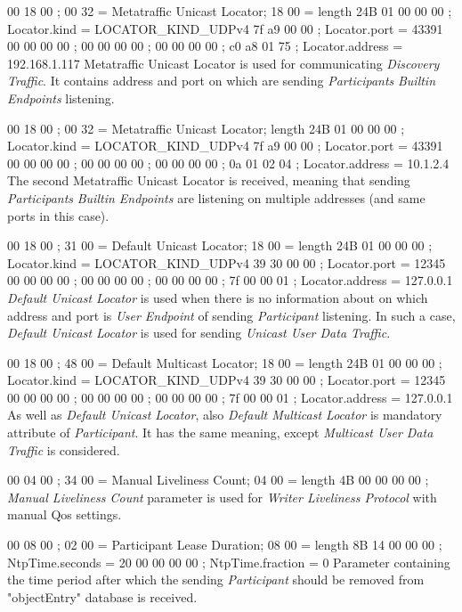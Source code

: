  00 18 00  ; 00 32 = Metatraffic Unicast Locator; 18 00 = length 24B
 01 00 00 00  ; Locator.kind = LOCATOR_KIND_UDPv4
 7f a9 00 00  ; Locator.port = 43391
 00 00 00 00  ;
 00 00 00 00  ;
 00 00 00 00  ;
 c0 a8 01 75  ; Locator.address = 192.168.1.117
\endtt
Metatraffic Unicast Locator is used for communicating {\em Discovery Traffic}. It contains  address and port on which are sending {\em Participants} {\em Builtin Endpoints} listening.

 00 18 00  ; 00 32 = Metatraffic Unicast Locator; length 24B
 01 00 00 00  ; Locator.kind = LOCATOR_KIND_UDPv4
 7f a9 00 00  ; Locator.port = 43391
 00 00 00 00  ;
 00 00 00 00  ;
 00 00 00 00  ;
 0a 01 02 04  ; Locator.address = 10.1.2.4
\endtt
The second Metatraffic Unicast Locator is received, meaning that sending {\em Participants} {\em Builtin Endpoints} are listening on multiple  addresses (and same ports in this case).

 00 18 00  ; 31 00 = Default Unicast Locator; 18 00 = length 24B
 01 00 00 00  ; Locator.kind = LOCATOR_KIND_UDPv4
 39 30 00 00  ; Locator.port = 12345
 00 00 00 00  ;
 00 00 00 00  ;
 00 00 00 00  ;
 7f 00 00 01  ; Locator.address = 127.0.0.1
\endtt
{\em Default Unicast Locator} is used when there is no information about on which  address and port is {\em User Endpoint} of sending {\em Participant} listening. In such a case, {\em Default Unicast Locator} is used for sending {\em Unicast User Data Traffic}.

 00 18 00  ; 48 00 = Default Multicast Locator; 18 00 = length 24B
 01 00 00 00  ; Locator.kind = LOCATOR_KIND_UDPv4
 39 30 00 00  ; Locator.port = 12345
 00 00 00 00  ;
 00 00 00 00  ;
 00 00 00 00  ;
 7f 00 00 01  ; Locator.address = 127.0.0.1
\endtt
As well as {\em Default Unicast Locator}, also {\em Default Multicast Locator} is mandatory attribute of {\em Participant}. It has the same meaning, except {\em Multicast User Data Traffic} is considered. 

 00 04 00  ; 34 00 = Manual Liveliness Count; 04 00 = length 4B
 00 00 00 00  ;
\endtt
{\em Manual Liveliness Count} parameter is used for {\em Writer Liveliness Protocol} with manual Qos settings.

 00 08 00  ; 02 00 = Participant Lease Duration; 08 00 = length 8B
 14 00 00 00  ; NtpTime.seconds = 20
 00 00 00 00  ; NtpTime.fraction = 0
\endtt
Parameter containing the time period after which the sending {\em Participant} should be removed from "objectEntry" database is received.

